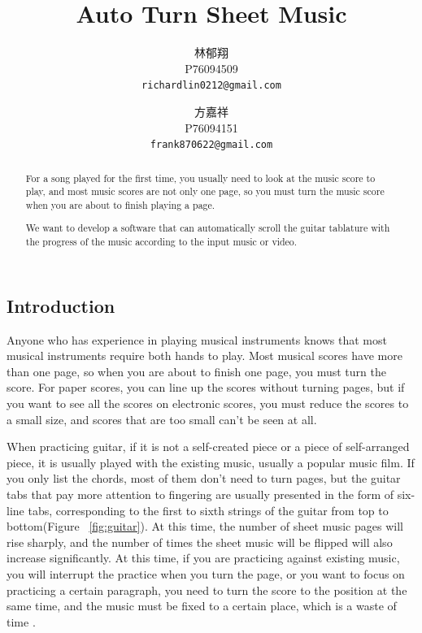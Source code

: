 \documentclass[10pt,twocolumn,letterpaper]{article}
\begin{document}
\begin{CJK}{UTF8}{bsmi}

\title{Auto Turn Sheet Music}

\author{林郁翔\\
P76094509\\
{\tt\small richardlin0212@gmail.com}
\and
方嘉祥\\
P76094151\\
{\tt\small frank870622@gmail.com}
}

\maketitle

\begin{abstract}
   For a song played for the first time, you usually need to look at the music score to play, and most music scores are not only one page, so you must turn the music score when you are about to finish playing a page.

   We want to develop a software that can automatically scroll the guitar tablature with the progress of the music according to the input music or video.
\end{abstract}

\section{Introduction}

Anyone who has experience in playing musical instruments knows that most musical instruments require both hands to play.
Most musical scores have more than one page, so when you are about to finish one page, you must turn the score.
For paper scores, you can line up the scores without turning pages, but if you want to see all the scores on electronic scores, you must reduce the scores to a small size, and scores that are too small can’t be seen at all.

When practicing guitar, if it is not a self-created piece or a piece of self-arranged piece, it is usually played with the existing music, usually a popular music film. If you only list the chords, most of them don’t need to turn pages, but the guitar tabs that pay more attention to fingering are usually presented in the form of six-line tabs, corresponding to the first to sixth strings of the guitar from top to bottom(Figure ~\ref{fig:guitar}). At this time, the number of sheet music pages will rise sharply, and the number of times the sheet music will be flipped will also increase significantly. At this time, if you are practicing against existing music, you will interrupt the practice when you turn the page, or you want to focus on practicing a certain paragraph, you need to turn the score to the position at the same time, and the music must be fixed to a certain place, which is a waste of time .


\end{CJK}
\end{document}
